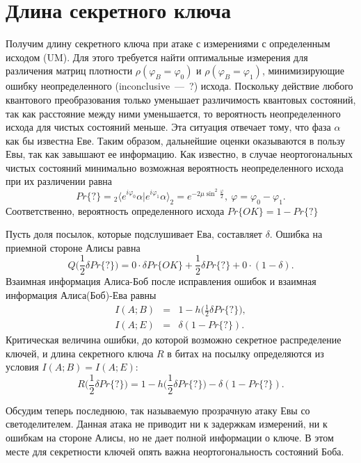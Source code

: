 \section{Длина секретного ключа}\label{sec:key_length}
Получим длину секретного ключа при атаке с измерениями с определенным исходом (UM). Для этого требуется найти оптимальные измерения для различения матриц плотности $\rho(\varphi_B = \varphi_0)$ и $\rho(\varphi_B = \varphi_1)$, минимизирующие ошибку неопределенного (inconclusive~---~?) исхода. 
Поскольку действие любого квантового преобразования только уменьшает различимость квантовых состояний, так как расстояние между ними уменьшается, то вероятность неопределенного исхода для чистых состояний меньше. Эта ситуация отвечает тому, что фаза $\alpha$ как бы известна Еве. Таким образом, дальнейшие оценки оказываются в пользу Евы, так как завышают ее информацию. 
Как известно, в случае неортогональных чистых состояний минимально возможная вероятность неопределенного исхода при их различении равна
\begin{equation*}
  Pr\{?\} = {}_2 \langle e^{i \varphi_0} \alpha | e^{i \varphi_1} \alpha \rangle_2 = e^{-2\mu\sin^2{\frac{\varphi}{2}}},~\varphi = \varphi_0 - \varphi_1.
\end{equation*}
Соответственно, вероятность определенного исхода $ Pr\{OK\} = 1 - Pr\{?\} $

Пусть доля посылок, которые подслушивает Ева, составляет $\delta$. Ошибка на приемной стороне Алисы равна
\begin{equation*}
  Q\bigg(\frac{1}{2}\delta Pr\{?\}\bigg) = 0 \cdot \delta Pr\{OK\} + \frac{1}{2}\delta Pr\{?\} + 0 \cdot (1 - \delta).
\end{equation*}
Взаимная информация Алиса-Боб после исправления ошибок и взаимная информация Алиса(Боб)-Ева равны
\begin{eqnarray*}
  I(A;B) &=& 1 - h\bigg(\frac{1}{2}\delta Pr\{?\}\bigg), \\
  I(A;E) &=& \delta(1 - Pr\{?\}).
\end{eqnarray*}
Критическая величина ошибки, до которой возможно секретное распределение ключей, и длина секретного ключа $R$ в битах на посылку определяются из условия $I(A;B) = I(A;E)$:
\begin{equation*}
  R\bigg(\frac{1}{2}\delta Pr\{?\}\bigg) = 1 - h\bigg(\frac{1}{2}\delta Pr\{?\}\bigg) - \delta(1 - Pr\{?\}).
\end{equation*}

Обсудим теперь последнюю, так называемую прозрачную атаку Евы со светоделителем. Данная атака не приводит ни к задержкам измерений, ни к ошибкам на стороне Алисы, но не дает полной информации о ключе. 
В этом месте для секретности ключей опять важна неортогональность состояний Боба.


